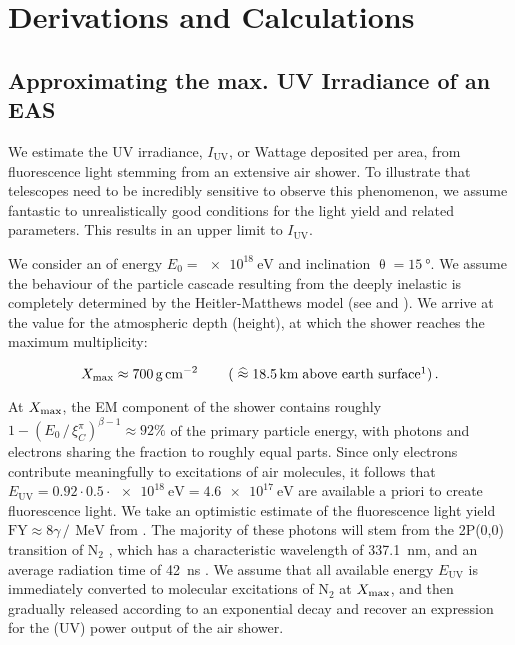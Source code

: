 
\chapter{Derivations and Calculations}
\label{app:derivation}


\section{Approximating the max. UV Irradiance of an EAS}
\label{app:cr-uv-irradiance}

We estimate the UV irradiance, $I_\text{UV}$, or Wattage deposited per area, 
from fluorescence light stemming from an extensive air shower. To illustrate 
that telescopes need to be incredibly sensitive to observe this phenomenon, we 
assume fantastic to unrealistically good conditions for the \UV light yield and 
related parameters. This results in an  upper limit to $I_\text{UV}$.

We consider an \EAS of energy $E_0 = \SI{e18}{\eV}$ and inclination 
$\uptheta=\SI{15}{\degree}$. We assume the behaviour of the particle cascade 
resulting from the deeply inelastic is completely determined by the 
Heitler-Matthews model (see  and 
\cite{matthewsHeitlerModelExtensive2005, rissePhotonAirShowers2006}). We arrive
at the value for the atmospheric depth (height), at which the shower reaches the
maximum multiplicity:

\begin{equation}
\label{eq:irradiance-multiplicity}
\Xmax \approx \SI{700}{\gram\per\centi\meter\squared}\qquad\left(\;\widehat{\approx}\;\SI{18.5}{\kilo\meter}\;\text{above earth surface}\footnotemark\right).
\end{equation}

At $X_\mathrm{max}$, the EM component of the shower contains roughly
$1-\left(E_0\,/\,\xi^\pi_C\right)^{\beta-1}\approx92\%$ of the primary particle 
energy, with photons and electrons sharing the fraction to roughly equal parts.
Since only electrons contribute meaningfully to excitations of air molecules, it 
follows that $E_\text{UV}=0.92\cdot0.5\cdot\SI{e18}{\electronvolt}=
\SI{4.6e17}{\electronvolt}$ are available a priori to create fluorescence light.
We take an optimistic estimate of the fluorescence light yield 
$\text{FY}\approx8\gamma\,/\,\SI{}{\mega\electronvolt}$ from \cite{Keilhauer2013}. 
The majority of these photons will stem from the 2P(0,0) transition of 
N$_2$ \cite{Ave2008}, which has a characteristic wavelength of 
\SI{337.1}{\nano\meter}, and an average radiation time of \SI{42}{\nano\second} 
\cite{Lean1989}. We assume that all available energy $E_\text{UV}$ is immediately 
converted to molecular excitations of N$_2$ at $X_\mathrm{max}$, and then gradually 
released according to an exponential decay and recover an expression for the (UV) 
power output of the air shower.

